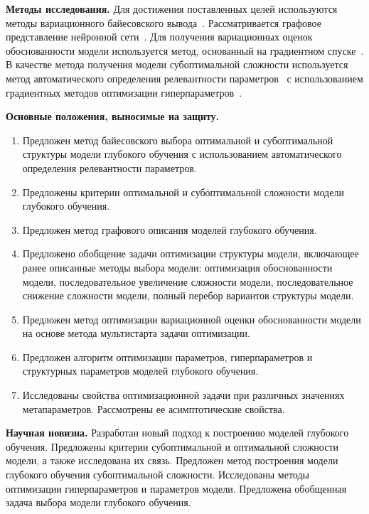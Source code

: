 \vspace{0.5cm}
\textbf{Методы исследования.} Для достижения поставленных целей используются методы вариационного байесовского вывода~\cite{mackay, bishop, early}. Рассматривается графовое представление нейронной сети~\cite{reinf,darts}. Для получения вариационных оценок обоснованности модели используется метод, основанный на градиентном спуске~\cite{sgd_cont, early}. В качестве метода получения модели субоптимальной сложности используется метод автоматического определения релевантности параметров~\cite{mackay,vae_ard} с использованием градиентных методов оптимизации гиперпараметров~\cite{hyper, hyper2, greed_hyper, approx_hyper}.

\vspace{0.5cm}
\textbf{Основные положения, выносимые на защиту.}
\vspace{0.3cm}
\begin{enumerate}
\item Предложен метод байесовского выбора оптимальной и субоптимальной структуры модели глубокого обучения с использованием автоматического определения
релевантности параметров.
\item Предложены критерии оптимальной и субоптимальной сложности модели глубокого обучения.
\item Предложен метод графового описания моделей глубокого обучения.
\item Предложено обобщение задачи оптимизации структуры модели, включающее ранее описанные методы выбора модели: оптимизация обоснованности модели, последовательное увеличение сложности модели, последовательное снижение сложности модели, полный перебор вариантов структуры модели.
\item Предложен метод оптимизации вариационной оценки обоснованности модели на основе метода мультистарта задачи оптимизации.
\item Предложен алгоритм оптимизации параметров, гиперпараметров и структурных параметров моделей глубокого обучения.
\item Исследованы свойства оптимизационной задачи при различных значениях метапараметров. Рассмотрены ее асимптотические свойства.
\end{enumerate}


\vspace{0.5cm}
\textbf{Научная новизна.} Разработан новый подход к построению моделей глубокого обучения. Предложены критерии субоптимальной и оптимальной сложности модели, а также исследована их связь. Предложен метод построения модели глубокого обучения субоптимальной сложности. Исследованы методы оптимизации гиперпараметров и параметров модели.  Предложена обобщенная задача выбора модели глубокого обучения.

